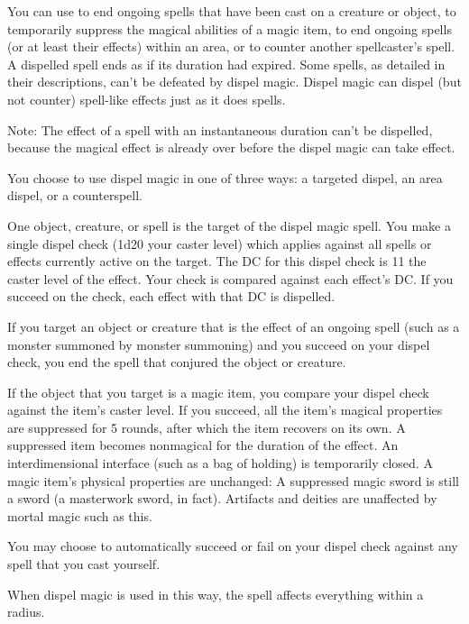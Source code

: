 \begin{spelleffect}
  You can use  to end ongoing spells that have been cast on a creature or object, to temporarily suppress the magical abilities of a magic item, to end ongoing spells (or at least their effects) within an area, or to counter another spellcaster's spell. A dispelled spell ends as if its duration had expired. Some spells, as detailed in their descriptions, can't be defeated by dispel magic. Dispel magic can dispel (but not counter) spell-like effects just as it does spells.
  \par Note: The effect of a spell with an instantaneous duration can't be dispelled, because the magical effect is already over before the dispel magic can take effect. 
  \par You choose to use dispel magic in one of three ways: a targeted dispel, an area dispel, or a counterspell.

  \par {} One object, creature, or spell is the target of the dispel magic spell. You make a single dispel check (1d20 \add your caster level) which applies against all spells or effects currently active on the target. The DC for this dispel check is 11 \add the caster level of the effect. Your check is compared against each effect's DC. If you succeed on the check, each effect with that DC is dispelled.

  \par If you target an object or creature that is the effect of an ongoing spell (such as a monster summoned by monster summoning) and you succeed on your dispel check, you end the spell that conjured the object or creature.
  \par If the object that you target is a magic item, you compare your dispel check against the item's caster level. If you succeed, all the item's magical properties are suppressed for 5 rounds, after which the item recovers on its own. A suppressed item becomes nonmagical for the duration of the effect. An interdimensional interface (such as a bag of holding) is temporarily closed. A magic item's physical properties are unchanged: A suppressed magic sword is still a sword (a masterwork sword, in fact). Artifacts and deities are unaffected by mortal magic such as this.
  \par You may choose to automatically succeed or fail on your dispel check against any spell that you cast yourself.
  \par {} When dispel magic is used in this way, the spell affects everything within a \areamed radius.


\end{spelleffect}
